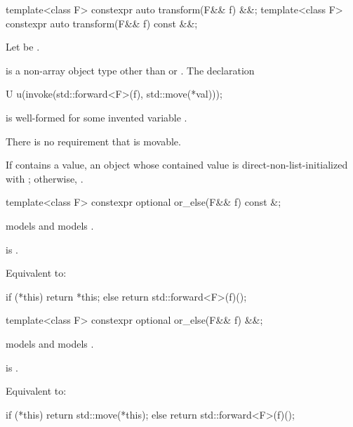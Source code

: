 \begin{itemdecl}
template<class F> constexpr auto transform(F&& f) &&;
template<class F> constexpr auto transform(F&& f) const &&;
\end{itemdecl}

\begin{itemdescr}
\pnum
Let  be
.

\pnum
\mandates
{} is a non-array object type
other than  or .
The declaration
\begin{codeblock}
U u(invoke(std::forward<F>(f), std::move(*val)));
\end{codeblock}
is well-formed for some invented variable .
\begin{note}
There is no requirement that  is movable.
\end{note}

\pnum
\returns
If  contains a value, an  object
whose contained value is direct-non-list-initialized with
;
otherwise, .
\end{itemdescr}

\begin{itemdecl}
template<class F> constexpr optional or_else(F&& f) const &;
\end{itemdecl}

\begin{itemdescr}
\pnum
\constraints
{} models  and
 models .

\pnum
\mandates
{} is .

\pnum
\effects
Equivalent to:
\begin{codeblock}
if (*this) {
  return *this;
} else {
  return std::forward<F>(f)();
}
\end{codeblock}
\end{itemdescr}

\begin{itemdecl}
template<class F> constexpr optional or_else(F&& f) &&;
\end{itemdecl}

\begin{itemdescr}
\pnum
\constraints
{} models  and
 models .

\pnum
\mandates
{} is .

\pnum
\effects
Equivalent to:
\begin{codeblock}
if (*this) {
  return std::move(*this);
} else {
  return std::forward<F>(f)();
}
\end{codeblock}
\end{itemdescr}

